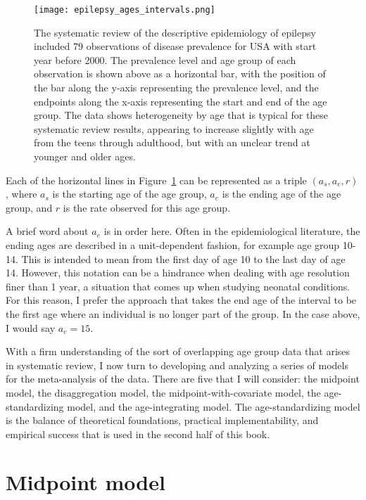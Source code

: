 \begin{figure}[ht]
\begin{center}
\texttt{[image: epilepsy\_ages\_intervals.png]}
\caption{The systematic review of the descriptive epidemiology of
  epilepsy included $79$ observations of disease prevalence for USA
  with start year before 2000. The prevalence level and age group of
  each observation is shown above as a horizontal bar, with the
  position of the bar along the y-axis representing the prevalence
  level, and the endpoints along the x-axis representing the start and
  end of the age group.  The data shows heterogeneity by age that is
  typical for these systematic review results, appearing to increase
  slightly with age from the teens through adulthood, but with an unclear trend
  at younger and older ages.  }
\label{theory-age_group_model-dismod_data_plot}
\end{center}
\end{figure}

Each of the horizontal lines in
Figure~\ref{theory-age_group_model-dismod_data_plot} can be
represented as a triple $({a_s}, {a_e}, r)$, where $a_s$ is the
starting age of the age group, $a_e$ is the ending age of the age
group, and $r$ is the rate observed for this age group.

A brief word about ${a_e}$ is in order here.  Often in the
epidemiological literature, the ending ages are described in a
unit-dependent fashion, for example age group 10-14.  This is intended
to mean from the first day of age 10 to the last day of age 14.
However, this notation can be a hindrance when dealing with age
resolution finer than 1 year, a situation that comes up when studying
neonatal conditions.  For this reason, I prefer the approach that
takes the end age of the interval to be the first age where an
individual is no longer part of the group.  In the case above, I would
say ${a_e} = 15$.


With a firm understanding of the sort of overlapping age group data
that arises in systematic review, I now turn to developing and
analyzing a series of models for the meta-analysis of the data.  There
are five that I will consider: the midpoint model, the disaggregation
model, the midpoint-with-covariate model, the age-standardizing model,
and the age-integrating model.  The age-standardizing model is the
balance of theoretical foundations, practical implementability, and
empirical success that is used in the second half of this
book.

\section{Midpoint model}

